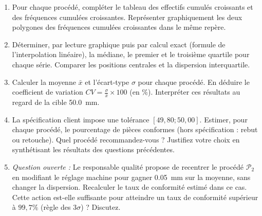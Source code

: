 \documentclass[11pt]{article}
\begin{document}
\begin{exercice}
\begin{enumerate}
    \item Pour chaque procédé, compléter le tableau des effectifs cumulés croissants et des fréquences cumulées croissantes. Représenter graphiquement les deux polygones des fréquences cumulées croissantes dans le même repère.
    \item Déterminer, par lecture graphique puis par calcul exact (formule de l'interpolation linéaire), la médiane, le premier et le troisième quartile pour chaque série. Comparer les positions centrales et la dispersion interquartile.
    \item Calculer la moyenne $\bar{x}$ et l'écart-type $\sigma$ pour chaque procédé. En déduire le coefficient de variation $CV = \frac{\sigma}{\bar{x}} \times 100$ (en \%). Interpréter ces résultats au regard de la cible \SI{50,0}{mm}.
    \item La spécification client impose une tolérance $[49,80 ; 50,00]$. Estimer, pour chaque procédé, le pourcentage de pièces conformes (hors spécification : rebut ou retouche). Quel procédé recommandez-vous ? Justifiez votre choix en synthétisant les résultats des questions précédentes.
    \item \textit{Question ouverte :} Le responsable qualité propose de recentrer le procédé $\mathcal{P}_2$ en modifiant le réglage machine pour gagner \SI{0,05}{mm} sur la moyenne, sans changer la dispersion. Recalculer le taux de conformité estimé dans ce cas. Cette action est-elle suffisante pour atteindre un taux de conformité supérieur à $99,7\%$ (règle des $3\sigma$) ? Discutez.
\end{enumerate}
\end{exercice}
\end{document}
